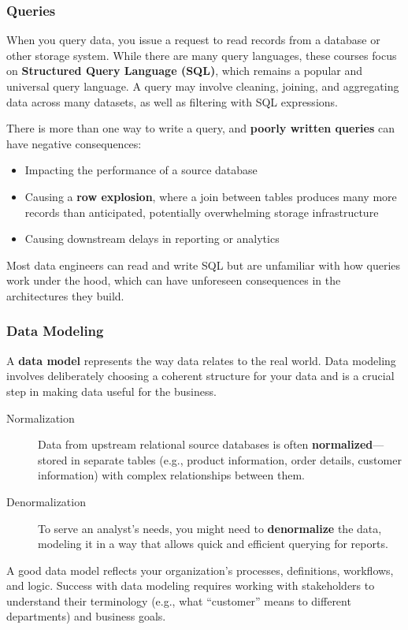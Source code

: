\documentclass{article}
\begin{document}
\subsubsection{Queries}
When you query data, you issue a request to read records from a database or other storage system. While there are many query languages, these courses focus on \textbf{Structured Query Language (SQL)}, which remains a popular and universal query language. A query may involve cleaning, joining, and aggregating data across many datasets, as well as filtering with SQL expressions.

There is more than one way to write a query, and \textbf{poorly written queries} can have negative consequences:
\begin{itemize}
    \item Impacting the performance of a source database
    \item Causing a \textbf{row explosion}, where a join between tables produces many more records than anticipated, potentially overwhelming storage infrastructure
    \item Causing downstream delays in reporting or analytics
\end{itemize}
Most data engineers can read and write SQL but are unfamiliar with how queries work under the hood, which can have unforeseen consequences in the architectures they build.

\subsubsection{Data Modeling}
A \textbf{data model} represents the way data relates to the real world. Data modeling involves deliberately choosing a coherent structure for your data and is a crucial step in making data useful for the business.

\begin{description}
    \item[Normalization] Data from upstream relational source databases is often \textbf{normalized}---stored in separate tables (e.g., product information, order details, customer information) with complex relationships between them.

    \item[Denormalization] To serve an analyst's needs, you might need to \textbf{denormalize} the data, modeling it in a way that allows quick and efficient querying for reports.
\end{description}

A good data model reflects your organization's processes, definitions, workflows, and logic. Success with data modeling requires working with stakeholders to understand their terminology (e.g., what ``customer'' means to different departments) and business goals.
\end{document}
